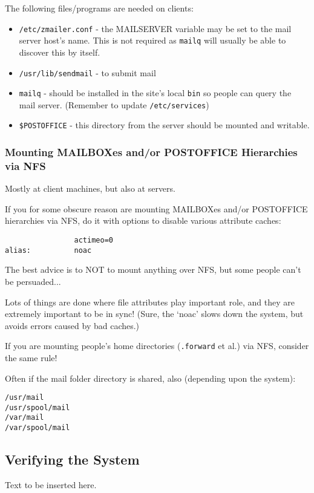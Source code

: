 The following files/programs are needed on clients:
\begin{itemize}
\item {\tt /etc/zmailer.conf} - the MAILSERVER variable may be set to the
mail server host's name.  This is not required as {\tt mailq} will usually be able
to discover this by itself.
\item {\tt /usr/lib/sendmail} - to submit mail
\item {\tt mailq} - should be installed in the site's local
{\tt bin} so people can query the mail server. (Remember to update {\tt /etc/services})
\item {\tt \$POSTOFFICE} - this directory from the server should be mounted and writable.
\end{itemize}


\subsubsection{Mounting MAILBOXes and/or POSTOFFICE Hierarchies via NFS}

Mostly at client machines, but also at servers.

If you for some obscure reason are mounting MAILBOXes
and/or POSTOFFICE hierarchies via NFS, do it with
options to disable various attribute caches:
\begin{verbatim}
                actimeo=0
alias:          noac
\end{verbatim}

The best advice is to NOT to mount anything over NFS,
but some people can't be persuaded...

Lots of things are done where file attributes play important
role, and they are extremely important to be in sync!
(Sure, the `noac' slows down the system, but avoids errors
caused by bad caches.)

If you are mounting people's home directories ({\tt .forward} et al.)
via NFS, consider the same rule!

Often if the mail folder directory is shared, also (depending upon the system):
\begin{verbatim}
/usr/mail
/usr/spool/mail
/var/mail
/var/spool/mail
\end{verbatim}



\subsection{Verifying the System}

Text to be inserted here.

